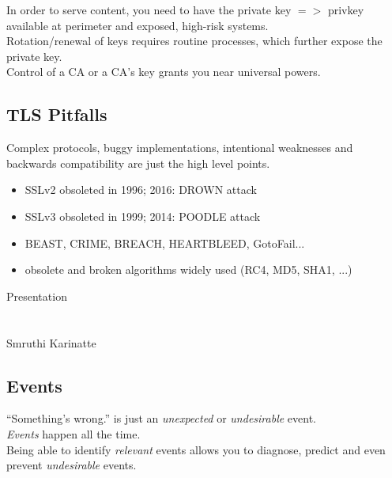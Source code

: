 \documentclass[xga]{xdvislides}
\begin{document}
In order to serve content, you need to have the
private key $ => $ privkey available at perimeter and
exposed, high-risk systems. \\

Rotation/renewal of keys requires routine processes,
which further expose the private key. \\

Control of a CA or a CA's key grants you near
universal powers. \\


\subsection{TLS Pitfalls}
Complex protocols, buggy implementations, intentional
weaknesses and backwards compatibility are just the
high level points.

\begin{itemize}
	\item SSLv2 obsoleted in 1996; 2016: DROWN attack
	\item SSLv3 obsoleted in 1999; 2014: POODLE attack
	\item BEAST, CRIME, BREACH, HEARTBLEED, GotoFail...
	\item obsolete and broken algorithms widely used (RC4, MD5, SHA1, ...)
\end{itemize}

\newpage
\vspace*{\fill}
\begin{center}
    \Hugesize
        Presentation \\ [1em]
    \hspace*{5mm}
    \blueline\\
    \hspace*{5mm}\\
	Smruthi Karinatte
\end{center}
\vspace*{\fill}

\subsection{Events}
\vspace*{\fill}
\Huge
\begin{center}
``Something's wrong.'' is just an {\em unexpected} or
{\em undesirable} event. \\
\vspace{.4in}
{\em Events} happen all the time. \\
\vspace{.4in}
Being able to identify {\em relevant} events allows
you to diagnose, predict and even prevent {\em
undesirable} events.
\end{center}
\Normalsize
\vspace*{\fill}
\end{document}
